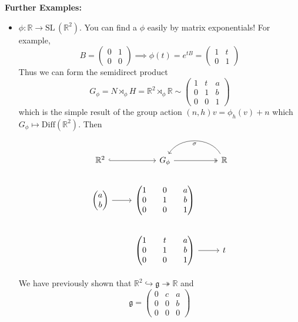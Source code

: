 \documentclass[12pt]{article}
\newcommand{\R}{\mathbb{R}}
\newcommand{\SL}{\text{SL}\,}
\newcommand{\g}{\mathfrak{g}}
\begin{document}
    \textbf{Further Examples:} 
    \begin{itemize}
        \item $\phi: \R \to \SL(\R^2)$. You can find a $\phi$ easily by matrix exponentials! For example, 
        \[B = \begin{pmatrix}
            0 & 1\\ 
            0 & 0
        \end{pmatrix} \implies \phi(t) = e^{tB} = \begin{pmatrix}
            1 & t\\ 
            0 & 1
        \end{pmatrix}\] 
        Thus we can form the semidirect product
        \[G_{\phi} = N \rtimes_{\phi} H = \R^2 \rtimes_{\phi} \R \sim \begin{pmatrix}
            1 & t & a\\ 
            0 & 1 & b\\
            0 & 0 & 1
        \end{pmatrix}\]
        which is the simple result of the group action $(n, h)v = \phi_h(v) + n$ which $G_{\phi} \mapsto \text{Diff}(\R^2)$. Then 
        \[\begin{tikzcd}
            \R^2 \arrow[hook]{r} & G_{\phi} \arrow[two heads]{r} & \R \arrow[bend right=60]{l}{\sigma}\\ 
            \begin{pmatrix}
                a\\b
            \end{pmatrix} \arrow{r} & \begin{pmatrix}
                1 & 0 & a\\ 
                0 & 1 & b\\ 
                0 & 0 & 1
            \end{pmatrix} & \\ 
            & \begin{pmatrix}
                1 & t & a\\ 
                0 & 1 & b\\ 
                0 & 0 & 1
            \end{pmatrix} \arrow{r} & t
        \end{tikzcd}\]

        We have previously shown that $\R^2 \hookrightarrow \g \twoheadrightarrow \R$ and 
        \[\g = \begin{pmatrix}
            0 & c & a\\ 
            0 & 0 & b\\ 
            0 & 0 & 0
        \end{pmatrix}\]


\end{itemize}
\end{document}
